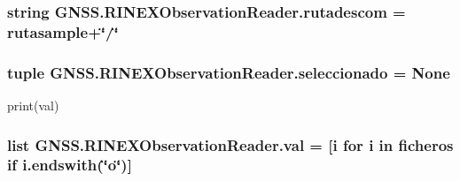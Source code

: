 \subsubsection[{rutadescom}]{\setlength{\rightskip}{0pt plus 5cm}string G\-N\-S\-S.\-R\-I\-N\-E\-X\-Observation\-Reader.\-rutadescom = rutasample+\char`\"{}/\char`\"{}}\label{namespaceGNSS_1_1RINEXObservationReader_a8ff076414ffc7b55f7bfbca86cc98b95}
\subsubsection[{seleccionado}]{\setlength{\rightskip}{0pt plus 5cm}tuple G\-N\-S\-S.\-R\-I\-N\-E\-X\-Observation\-Reader.\-seleccionado = None}\label{namespaceGNSS_1_1RINEXObservationReader_a4f16bfead9bd5de2ab8ade811b37a688}


print(val) 

\subsubsection[{val}]{\setlength{\rightskip}{0pt plus 5cm}list G\-N\-S\-S.\-R\-I\-N\-E\-X\-Observation\-Reader.\-val = [i for i in {\bf ficheros} if i.\-endswith(\char`\"{}o\char`\"{})]}\label{namespaceGNSS_1_1RINEXObservationReader_a8bd526fb49990377afa3e18e2838093b}
